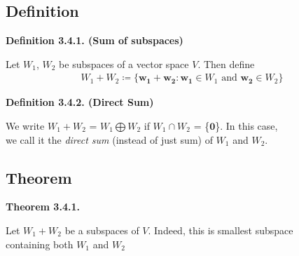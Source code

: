 \documentclass[12pt]{article}
\begin{document}
\subsection{Definition}

\textbf{Definition 3.4.1. (Sum of subspaces)}

Let $W_1$, $W_2$ be subspaces of a vector space $V$. Then define
\begin{align*}
    W_1 + W_2 \coloneq \{\mathbf{w_1} + \mathbf{w_2} : \mathbf{w_1}\in W_1 \text{ and } \mathbf{w_2}\in W_2\} 
\end{align*}

\textbf{Definition 3.4.2. (Direct Sum)}

We write $W_1 + W_2$ = $W_1 \bigoplus W_2$ if $W_1 \cap W_2$ = \{$\mathbf{0}$\}. In this case, \\
we call it the \emph{direct sum} (instead of just sum) of $W_1$ and $W_2$.

\subsection{Theorem}

\textbf{Theorem 3.4.1.}

Let $W_1 + W_2$ be a subspaces of $V$. Indeed, this is smallest subspace\\ 
containing both $W_1$ and $W_2$
\end{document}
